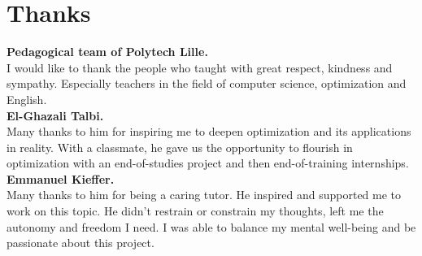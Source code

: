 \chapter*{Thanks}

\textbf{Pedagogical team of Polytech Lille.}\\
I would like to thank the people who taught with great respect, kindness and sympathy. Especially teachers in the field of computer science, optimization and English.\\

\textbf{El-Ghazali Talbi.}\\
Many thanks to him for inspiring me to deepen optimization and its applications in reality. With a classmate, he gave us the opportunity to flourish in optimization with an end-of-studies project and then end-of-training internships.\\

\textbf{Emmanuel Kieffer.}\\
Many thanks to him for being a caring tutor. He inspired and supported me to work on this topic. He didn't restrain or constrain my thoughts, left me the autonomy and freedom I need. I was able to balance my mental well-being and be passionate about this project.
